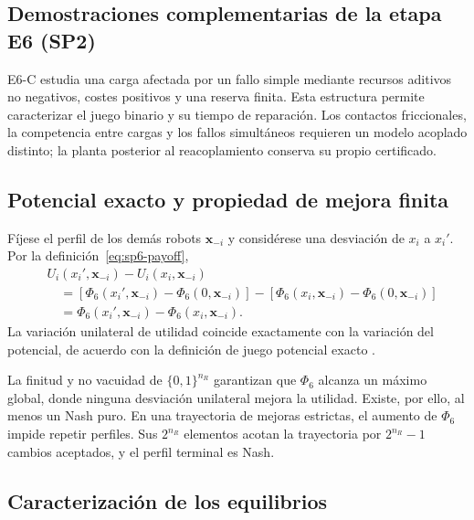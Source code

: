 \subsection{Demostraciones complementarias de la etapa E6 (SP2)}
\label{app:sp6-proofs}

E6-C estudia una carga afectada por un fallo simple mediante recursos aditivos no negativos, costes positivos y una reserva finita. Esta estructura permite caracterizar el juego binario y su tiempo de reparación. Los contactos friccionales, la competencia entre cargas y los fallos simultáneos requieren un modelo acoplado distinto; la planta posterior al reacoplamiento conserva su propio certificado.

\subsection{Potencial exacto y propiedad de mejora finita}
\label{app:sp6-exact-potential-proof}

Fíjese el perfil de los demás robots $\boldsymbol x_{-i}$ y considérese una desviación de $x_i$ a $x_i'$. Por la definición~\eqref{eq:sp6-payoff},
\begin{align*}
 &U_i(x_i',\boldsymbol x_{-i})-U_i(x_i,\boldsymbol x_{-i})\\
 &\quad=\left[\Phi_6(x_i',\boldsymbol x_{-i})-\Phi_6(0,\boldsymbol x_{-i})\right]
 -\left[\Phi_6(x_i,\boldsymbol x_{-i})-\Phi_6(0,\boldsymbol x_{-i})\right]\\
 &\quad=\Phi_6(x_i',\boldsymbol x_{-i})-\Phi_6(x_i,\boldsymbol x_{-i}).
\end{align*}
La variación unilateral de utilidad coincide exactamente con la variación del potencial, de acuerdo con la definición de juego potencial exacto \parencite{monderer1996potential}.

La finitud y no vacuidad de \(\{0,1\}^{n_R}\) garantizan que \(\Phi_6\) alcanza un máximo global, donde ninguna desviación unilateral mejora la utilidad. Existe, por ello, al menos un Nash puro. En una trayectoria de mejoras estrictas, el aumento de \(\Phi_6\) impide repetir perfiles. Sus \(2^{n_R}\) elementos acotan la trayectoria por \(2^{n_R}-1\) cambios aceptados, y el perfil terminal es Nash.

\subsection{Caracterización de los equilibrios}
\label{app:sp6-nash-characterization}

